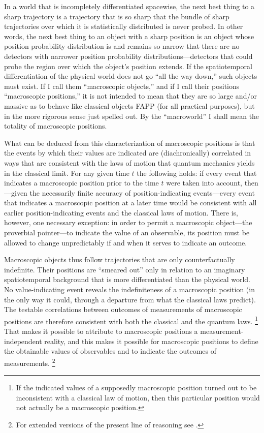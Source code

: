 In a world that is incompletely differentiated spacewise, the next best thing to a sharp trajectory is a trajectory that is so sharp that the bundle of sharp trajectories over which it is statistically distributed is never probed. In other words, the next best thing to an object with a sharp position is an object whose position probability distribution is and remains so narrow that there are no detectors with narrower position probability distributions---detectors that could probe the region over which the object's position extends. If the spatiotemporal differentiation of the physical world does not go ``all the way down,'' such objects must exist. If I call them ``macroscopic objects,'' and if I call their positions ``macroscopic positions,'' it is not intended to mean that they are so large and/or massive as to behave like classical objects FAPP (for all practical purposes), but in the more rigorous sense just spelled out. By the ``macroworld'' I shall mean the totality of macroscopic positions.

What can be deduced from this characterization of macroscopic positions is that the events by which their values are indicated are (diachronically) correlated in ways that are consistent with the laws of motion that quantum mechanics yields in the classical limit. For any given time $t$ the following holds: if every event that indicates a macroscopic position prior to the time $t$ were taken into account, then---given the necessarily finite accuracy of position-indicating events---every event that indicates a macroscopic position at a later time would be consistent with all earlier position-indicating events and the classical laws of motion. There is, however, one necessary exception: in order to permit a macroscopic object---the proverbial pointer---to indicate the value of an observable, its position must be allowed to change unpredictably if and when it serves to indicate an outcome.

Macroscopic objects thus follow trajectories that are only counterfactually indefinite. Their positions are ``smeared out'' only in relation to an imaginary spatiotemporal background that is more differentiated than the physical world. No value-indicating event reveals the indefiniteness of a macroscopic position (in the only way it could, through a departure from what the classical laws predict). The testable correlations between outcomes of measurements of macroscopic positions are therefore consistent with both the classical and the quantum laws.%
\footnote{If the indicated values of a supposedly macroscopic position turned out to be inconsistent with a classical law of motion, then this particular position would not actually be a macroscopic position.}
That makes it possible to attribute to macroscopic positions a measurement-independent reality, and this makes it possible for macroscopic positions to define the obtainable values of observables and to indicate the outcomes of measurements.%
\footnote{For extended versions of the present line of reasoning see \citep{Mohrhoff2009a,Mohrhoff2014}.}

